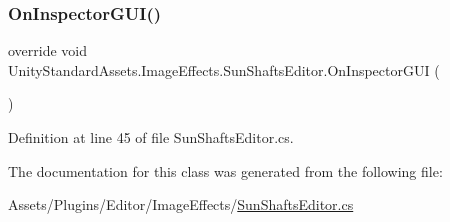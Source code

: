 \subsubsection{\texorpdfstring{On\+Inspector\+G\+U\+I()}{OnInspectorGUI()}}
{\footnotesize\ttfamily override void Unity\+Standard\+Assets.\+Image\+Effects.\+Sun\+Shafts\+Editor.\+On\+Inspector\+G\+UI (\begin{DoxyParamCaption}{ }\end{DoxyParamCaption})}



Definition at line 45 of file Sun\+Shafts\+Editor.\+cs.



The documentation for this class was generated from the following file\+:\begin{DoxyCompactItemize}
\item 
Assets/\+Plugins/\+Editor/\+Image\+Effects/\mbox{\hyperlink{_sun_shafts_editor_8cs}{Sun\+Shafts\+Editor.\+cs}}\end{DoxyCompactItemize}
